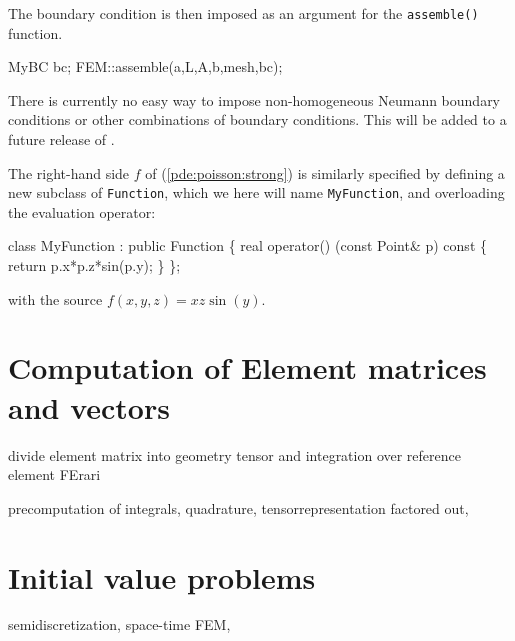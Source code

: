 The boundary condition is then imposed as an argument for 
the \texttt{assemble()} function. 
\begin{code}
MyBC bc; 
FEM::assemble(a,L,A,b,mesh,bc);
\end{code}

There is currently no easy way to impose non-homogeneous
Neumann boundary conditions or other combinations of boundary
conditions. This will be added to a future release of \dolfin{}.

The right-hand side $f$ of (\ref{pde:poisson:strong}) is similarly 
specified by defining a new subclass of \texttt{Function}, which we
here will name \texttt{MyFunction}, and overloading the evaluation
operator: 
\begin{code}
  class MyFunction : public Function
  \{
    real operator() (const Point& p) const
    \{
      return p.x*p.z*sin(p.y);
    \}
  \};
\end{code}
with the source $f(x, y, z) = x z \sin(y)$. 

\section{Computation of Element matrices and vectors} 

divide element matrix into geometry tensor and integration 
over reference element FErari

precomputation of integrals, quadrature, tensorrepresentation factored out, \ffc{} 

\section{Initial value problems}

semidiscretization, space-time FEM, 

